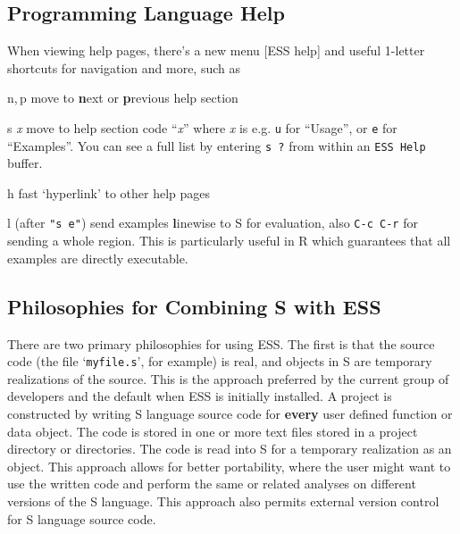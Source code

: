 \documentclass{article}
\newcommand{\stexttt}[1]{{\small\texttt{#1}}}
\newcommand{\file}[1]{`\stexttt{#1}'}
\begin{document}
\subsection{Programming Language Help}
\label{sec:S:help}

When viewing help pages, there's a new menu \textsf{[ESS help]} and
useful 1-letter shortcuts for navigation and more, such as
\begin{list}{}{\renewcommand{\makelabel}[1]{\bf#1\hfill}}
\item[n,\,p] move to \textbf{n}ext or \textbf{p}revious help section
\item[{s \textit{x}}] move to help section code ``\textit{x}'' where
  \textit{x} is e.g. \stexttt{u} for ``Usage'', or \stexttt{e} for
  ``Examples''.  You can see a full list by entering \stexttt{s ?} from within
an \stexttt{ESS Help} buffer.
\item[h] fast `hyperlink' to other help pages
\item[l] (after \stexttt{"s e"}) send examples \textbf{l}inewise to S for
  evaluation, also \stexttt{C-c C-r} for sending a whole region.  This 
  is particularly useful in R which guarantees that all examples are
  directly executable.
\end{list}

\subsection{Philosophies for Combining S with ESS}
\label{sec:S:philosophy}

There are two primary philosophies for using ESS.  The first is that
the source code (the file \file{myfile.s}, for example) is real,
and objects in S are temporary realizations of the source.  This is
the approach preferred by the current group of developers and the default
when ESS is initially installed.  A project is constructed by writing S
language source code for \textbf{every} user defined function or data
object.  The code is stored in one or more text files stored in a
project directory or directories.  The code is read into S for a
temporary realization as an object.  This approach allows for better
portability, where the user might want to use the written code and
perform the same or related analyses on different versions of the S
language.  This approach also permits external version control for
S language source code.
\end{document}
